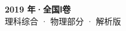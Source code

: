 \documentclass[zihao=-4, a4paper]{ctexart}
\begin{document}
\begin{center}
  {\Large\bfseries 2019 年·全国Ⅰ卷}\\[4pt]
  {\large 理科综合 · 物理部分 · 解析版}
\end{center}
\medskip
{}

\clearpage
{}

\end{document}
